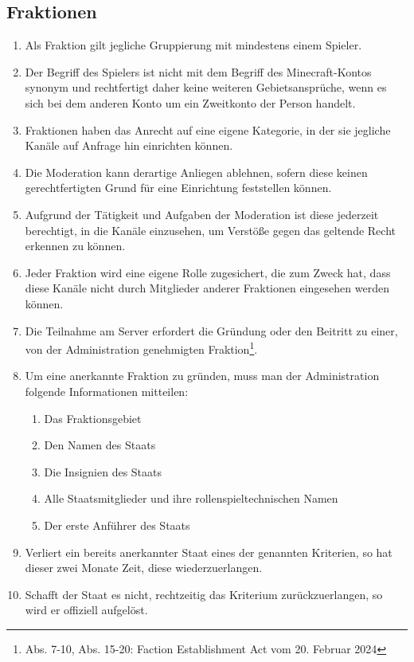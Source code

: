 \documentclass{article}
\begin{document}
\subsection{Fraktionen}
\begin{enumerate}[(1)]
	\item Als Fraktion gilt jegliche Gruppierung mit mindestens einem Spieler.
	\item Der Begriff des Spielers ist nicht mit dem Begriff des Minecraft-Kontos synonym und rechtfertigt daher keine weiteren Gebietsansprüche, wenn es sich bei dem anderen Konto um ein Zweitkonto der Person handelt.
	\item Fraktionen haben das Anrecht auf eine eigene Kategorie, in der sie jegliche Kanäle auf Anfrage hin einrichten können.
	\item Die Moderation kann derartige Anliegen ablehnen, sofern diese keinen gerechtfertigten Grund für eine Einrichtung feststellen können.
	\item Aufgrund der Tätigkeit und Aufgaben der Moderation ist diese jederzeit berechtigt, in die Kanäle einzusehen, um Verstöße gegen das geltende Recht erkennen zu können.
	\item Jeder Fraktion wird eine eigene Rolle zugesichert, die zum Zweck hat, dass diese Kanäle nicht durch Mitglieder anderer Fraktionen eingesehen werden können.
    \item Die Teilnahme am Server erfordert die Gründung oder den Beitritt zu einer, von der Administration genehmigten Fraktion\footnote{Abs. 7-10, Abs. 15-20: Faction Establishment Act vom 20. Februar 2024}.
    \item Um eine anerkannte Fraktion zu gründen, muss man der Administration folgende Informationen mitteilen:
    \begin{enumerate}[1.]
        \item Das Fraktionsgebiet
        \item Den Namen des Staats
        \item Die Insignien des Staats
        \item Alle Staatsmitglieder und ihre rollenspieltechnischen Namen
        \item Der erste Anführer des Staats
    \end{enumerate}
	\item Verliert ein bereits anerkannter Staat eines der genannten Kriterien, so hat dieser zwei Monate Zeit, diese wiederzuerlangen.
    \item Schafft der Staat es nicht, rechtzeitig das Kriterium zurückzuerlangen, so wird er offiziell aufgelöst.

\end{enumerate}
\end{document}
